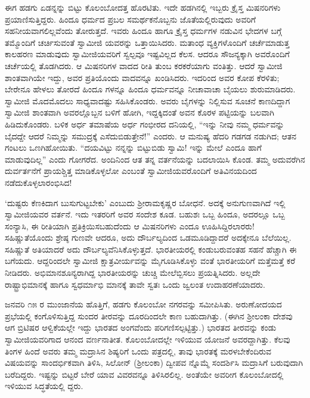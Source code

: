 ಈಗ ಹಡಗು ಏಡನ್ನನ್ನು ಬಿಟ್ಟು ಕೊಲಂಬೋದತ್ತ ಹೊರಟಿತು. ಇದೇ ಹಡಗಿನಲ್ಲಿ ಇಬ್ಬರು ಕ್ರೈಸ್ತ ಮಿಷನರಿಗಳು ಪ್ರಯಾಣಿಸುತ್ತಿದ್ದರು. ಹಿಂದೂ ಧರ್ಮದ ಪ್ರಬಲ ಸಮರ್ಥಕನೊಬ್ಬನು ಜೊತೆಯಲ್ಲಿರುವುದು ಅವರಿಗೆ ಸಹನೀಯವಾಗಲಿಲ್ಲವೆಂದು ತೋರುತ್ತದೆ. ಇವರು ಹಿಂದೂ ಹಾಗೂ ಕ್ರೈಸ್ತ ಧರ್ಮಗಳ ನಡುವಿನ ಭೇದಗಳ ಬಗ್ಗೆ ತಮ್ಮೊಂದಿಗೆ ಚರ್ಚಿಸುವಂತೆ ಸ್ವಾಮೀಜಿ ಯವರನ್ನು ಒತ್ತಾಯಿಸಿದರು. ಮತಾಂಧ ವ್ಯಕ್ತಿಗಳೊಂದಿಗೆ ಚರ್ಚೆಮಾಡುತ್ತ ಕಾಲಹರಣ ಮಾಡುವುದು ಸ್ವಾಮೀಜಿಯವರಿಗೆ ಸ್ವಲ್ಪವೂ ಇಷ್ಟವಿಲ್ಲದ ಕೆಲಸ. ಆದರೂ ಸೌಜನ್ಯಕ್ಕಾಗಿ ಅವರೊಂದಿಗೆ ಚರ್ಚೆಯಲ್ಲಿ ತೊಡಗಿದರು. ಆ ಮಿಷನರಿಗಳ ವಾದದ ರೀತಿ ತುಂಬ ಕರಕರೆಯಾಗು ವಂತಿತ್ತು. ಆದರೆ ಸ್ವಾಮೀಜಿ ಶಾಂತವಾಗಿಯೇ ಇದ್ದು, ಅವರ ಪ್ರತಿಯೊಂದು ವಾದವನ್ನೂ ಖಂಡಿಸಿದರು. ಇದರಿಂದ ಅವರ ಕೋಪ ಕೆರಳಿತು; ಬೇರೇನೂ ಹೇಳಲು ತೋರದೆ ಹಿಂದೂ ಗಳನ್ನೂ ಹಿಂದೂ ಧರ್ಮವನ್ನೂ ನೀಚಾವಾಚಾ ಬೈಯಲು ಶುರುಮಾಡಿದರು. ಸ್ವಾಮೀಜಿ ಮೊದಮೊದಲು ಸಾಧ್ಯವಾದಷ್ಟು ಸಹಿಸಿಕೊಂಡರು. ಅವರು ಬೈಗಳನ್ನು ನಿಲ್ಲಿಸುವ ಸೂಚನೆ ಕಾಣದಿದ್ದಾಗ ಸ್ವಾಮೀಜಿ ಶಾಂತವಾಗಿ ಅವರಲ್ಲೊಬ್ಬನ ಬಳಿಗೆ ಹೋಗಿ, ಇದ್ದಕ್ಕಿದಂತೆ ಅವನ ಕೊರಳ ಪಟ್ಟಿಯನ್ನು ಬಲವಾಗಿ ಹಿಡಿದುಕೊಂಡರು. ಬಳಿಕ ಅರ್ಧ ತಮಾಷೆಯ ಅರ್ಧ ಗಂಭೀರದ ದನಿಯಲ್ಲಿ, “ಇನ್ನು ನೀವು ನಮ್ಮ ಧರ್ಮವನ್ನು ಬೈದದ್ದೇ ಆದರೆ ನಿಮ್ಮನ್ನು ಸಮುದ್ರಕ್ಕೆ ಎಸೆದುಬಿಡುತ್ತೇನೆ!” ಎಂದರು. ಆ ಮನುಷ್ಯ ಹೆದರಿ ಗಡಗಡ ನಡುಗಿದ; ಆತನ ಗಂಟಲು ಒಣಗಿಹೋಯಿತು. “ದಯವಿಟ್ಟು ನನ್ನನ್ನು ಬಿಟ್ಟುಬಿಡು ಸ್ವಾಮಿ! ಇನ್ನು ಮೇಲೆ ಎಂದೂ ಹಾಗೆ ಮಾಡುವುದಿಲ್ಲ” ಎಂದು ಗೋಗರೆದ. ಅಂದಿನಿಂದ ಆತ ತನ್ನ ವರ್ತನೆಯನ್ನು ಬದಲಾಯಿಸಿ ಕೊಂಡ. ತಮ್ಮ ಅದುವರೆಗಿನ ದುರ್ವರ್ತನೆಗೆ ಪ್ರಾಯಶ್ಚಿತ್ತ ಮಾಡಿಕೊಳ್ಳಲೋ ಎಂಬಂತೆ ಸ್ವಾಮೀಜಿಯವರೊಂದಿಗೆ ಅತಿವಿನಯದಿಂದ ನಡೆದುಕೊಳ್ಳಲಾರಂಭಿಸಿದ!

‘ದುಷ್ಟರು ಕೆಣಕಿದಾಗ ಬುಸುಗುಟ್ಟಬೇಕು’ ಎಂಬುದು ಶ್ರೀರಾಮಕೃಷ್ಣರ ಬೋಧನೆ. ಅದಕ್ಕೆ ಅನುಗುಣವಾಗಿದೆ ಇಲ್ಲಿ ಸ್ವಾಮೀಜಿಯವರ ವರ್ತನೆ. ಇದು ಇತರರಿಗೆ ಅವರ ಸಂದೇಶ ಕೂಡ. ಬಹುಶಃ ಒಬ್ಬ ಹಿಂದೂ, ಅದರಲ್ಲೂ ಒಬ್ಬ ಸಂನ್ಯಾಸಿ, ಈ ರೀತಿಯಾಗಿ ಪ್ರತಿಕ್ರಿಯಿಸಬಹುದೆಂದು ಆ ಮಿಷನರಿಗಳು ಎಂದೂ ಊಹಿಸಿದ್ದಿರಲಾರರು! ಸಹಿಷ್ಣುತೆಯೊಂದು ಶ್ರೇಷ್ಠ ಗುಣವೇ ಆದರೂ, ಅದು ದೌರ್ಬಲ್ಯದಿಂದ ಒಡಮೂಡಿದ್ದಾದರೆ ಅದಕ್ಕೇನೂ ಬೆಲೆಯಿಲ್ಲ. ಸಹಿಷ್ಣುತೆ ಅತಿಯಾದರೆ ಅದು ದೌರ್ಬಲ್ಯವೆನಿಸಿಕೊಳ್ಳುತ್ತದೆ. ಭಾರತೀಯರಲ್ಲಿ ಕಂಡುಬರುವಂತಹ ಸಹನೆ ಹೆಚ್ಚಾಗಿ ಈ ಬಗೆಯದು. ಆದ್ದರಿಂದಲೇ ಸ್ವಾಮೀಜಿ ಕ್ಷಾತ್ರವೀರ್ಯವನ್ನು ಮೈಗೂಡಿಸಿಕೊಳ್ಳು ವಂತೆ ಭಾರತೀಯರಿಗೆ ಮತ್ತೆಮತ್ತೆ ಕರೆ ನೀಡಿದರು. ಅಭಿಮಾನಶೂನ್ಯರಾಗಿದ್ದ ಭಾರತೀಯರನ್ನು ಚುಚ್ಚಿ ಮೇಲೆಬ್ಬಿಸಲು ಪ್ರಯತ್ನಿಸಿದರು. ಅಲ್ಲದೇ ರಾಷ್ಟ್ರಾಭಿಮಾನಕ್ಕೆ ಹಾಗೂ ಸ್ವಧರ್ಮಾಭಿ ಮಾನಕ್ಕೆ ತಾವೇ ಸ್ವತಃ ಒಂದು ಜ್ವಲಂತ ಉದಾಹರಣೆಯಾದರು.

ಜನವರಿ ೧೫ ರ ಮುಂಜಾನೆಯ ಹೊತ್ತಿಗೆ, ಹಡಗು ಕೊಲಂಬೋ ನಗರವನ್ನು ಸಮೀಪಿಸಿತು. ಅರುಣೋದಯದ ಪ್ರಭೆಯಲ್ಲಿ ಕಂಗೊಳಿಸುತ್ತಿದ್ದ ಸುಂದರ ತೀರವನ್ನು ದೂರದಿಂದಲೇ ಕಾಣ ಬಹುದಾಗಿತ್ತು. (ಈಗಿನ ಶ್ರೀಲಂಕಾ ದೇಶವು ಆಗ ಬ್ರಿಟಿಷರ ಆಳ್ವಿಕೆಯಲ್ಲೇ ಇದ್ದು ಭಾರತದ ಅಂಗವೆಂದು ಪರಿಗಣಿಸಲ್ಪಟ್ಟಿತ್ತು.) ಭಾರತದ ತೀರವನ್ನು ಕಂಡು ಸ್ವಾಮೀಜಿಯವರಿಗಾದ ಆನಂದ ವರ್ಣನಾತೀತ. ಕೊಲಂಬೋದಲ್ಲೇ ಇಳಿಯುವ ಯೋಜನೆ ಅವರದ್ದಾಗಿತ್ತು. ಕೆಲವು ತಿಂಗಳ ಹಿಂದೆ ಅವರು ತಮ್ಮ ಮದ್ರಾಸಿನ ಶಿಷ್ಯರಿಗೆ ಒಂದು ಪತ್ರದಲ್ಲಿ, ತಾವು ಭಾರತಕ್ಕೆ ಮರಳಬೇಕೆಂದಿರುವ ವಿಷಯವನ್ನು ಸಾಂದರ್ಭಿಕವಾಗಿ ತಿಳಿಸಿ, ಸಿಲೋನ್ (ಶ್ರೀಲಂಕಾ) ದ್ವೀಪವ ನ್ನೊಮ್ಮೆ ಸಂದರ್ಶಿಸಿ ಮದ್ರಾಸಿಗೆ ಬರುವುದಾಗಿ ಬರೆದಿದ್ದರು. ಇಷ್ಟನ್ನು ಬಿಟ್ಟರೆ ಬೇರೆ ಯಾವ ವಿವರವನ್ನೂ ತಿಳಿಸಿರಲಿಲ್ಲ. ಅಂತೆಯೇ ಅವರೀಗ ಕೊಲಂಬೋದಲ್ಲಿ ಇಳಿಯುವ ಸಿದ್ಧತೆಯಲ್ಲಿ ದ್ದರು.

